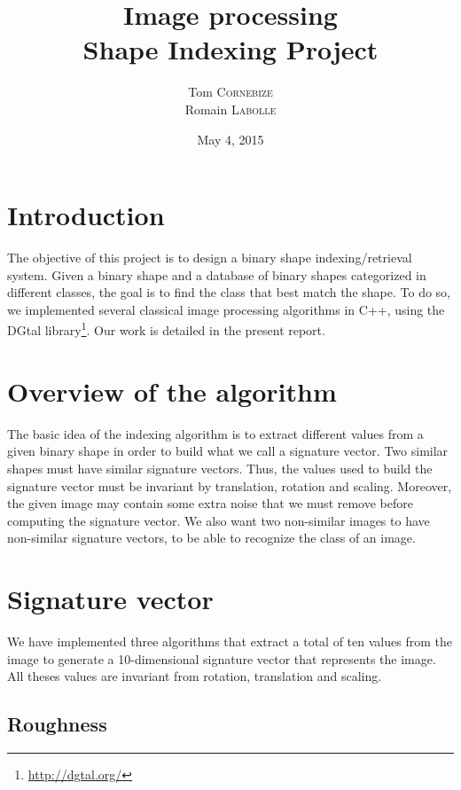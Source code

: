 \documentclass[a4paper,12pt]{article}
\title{Image processing\\Shape Indexing Project}
\author{Tom \textsc{Cornebize}\\Romain \textsc{Labolle}}
\date{May 4, 2015}
\theoremstyle{example}
\theoremstyle{remark}
\theoremstyle{definition}
\begin{document}
\maketitle

\pagestyle{fancy}

\section{Introduction}

The objective of this project is to design a binary shape indexing/retrieval system. Given a binary shape and a database of binary shapes categorized in different classes, the goal is to find the class that best match the shape. To do so, we implemented several classical image processing algorithms in C++, using the DGtal library\footnote{\url{http://dgtal.org/}}. Our work is detailed in the present report.

\section{Overview of the algorithm}

The basic idea of the indexing algorithm is to extract different values from a given binary shape in order to build what we call a signature vector. Two similar shapes must have similar signature vectors. Thus, the values used to build the signature vector must be invariant by translation, rotation and scaling. Moreover, the given image may contain some extra noise that we must remove before computing the signature vector. We also want two non-similar images to have non-similar signature vectors, to be able to recognize the class of an image.

\section{Signature vector}

We have implemented three algorithms that extract a total of ten values from the image to generate a 10-dimensional signature vector that represents the image. All theses values are invariant from rotation, translation and scaling.

\subsection{Roughness}
\end{document}
